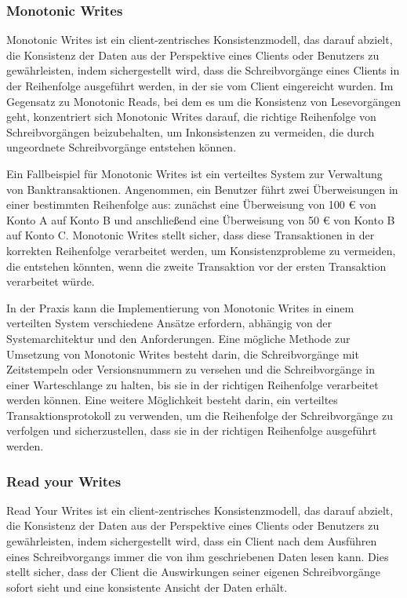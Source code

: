 \documentclass[../vs-script-first-v01.tex]{subfiles}
\begin{document}
\subsubsection{Monotonic Writes}

Monotonic Writes ist ein client-zentrisches Konsistenzmodell, das darauf abzielt, die Konsistenz der Daten aus der Perspektive eines Clients oder Benutzers zu gewährleisten, indem sichergestellt wird, dass die Schreibvorgänge eines Clients in der Reihenfolge ausgeführt werden, in der sie vom Client eingereicht wurden. Im Gegensatz zu Monotonic Reads, bei dem es um die Konsistenz von Lesevorgängen geht, konzentriert sich Monotonic Writes darauf, die richtige Reihenfolge von Schreibvorgängen beizubehalten, um Inkonsistenzen zu vermeiden, die durch ungeordnete Schreibvorgänge entstehen können.

Ein Fallbeispiel für Monotonic Writes ist ein verteiltes System zur Verwaltung von Banktransaktionen. Angenommen, ein Benutzer führt zwei Überweisungen in einer bestimmten Reihenfolge aus: zunächst eine Überweisung von 100 € von Konto A auf Konto B und anschließend eine Überweisung von 50 € von Konto B auf Konto C. Monotonic Writes stellt sicher, dass diese Transaktionen in der korrekten Reihenfolge verarbeitet werden, um Konsistenzprobleme zu vermeiden, die entstehen könnten, wenn die zweite Transaktion vor der ersten Transaktion verarbeitet würde.

In der Praxis kann die Implementierung von Monotonic Writes in einem verteilten System verschiedene Ansätze erfordern, abhängig von der Systemarchitektur und den Anforderungen. Eine mögliche Methode zur Umsetzung von Monotonic Writes besteht darin, die Schreibvorgänge mit Zeitstempeln oder Versionsnummern zu versehen und die Schreibvorgänge in einer Warteschlange zu halten, bis sie in der richtigen Reihenfolge verarbeitet werden können. Eine weitere Möglichkeit besteht darin, ein verteiltes Transaktionsprotokoll zu verwenden, um die Reihenfolge der Schreibvorgänge zu verfolgen und sicherzustellen, dass sie in der richtigen Reihenfolge ausgeführt werden.

\subsubsection{Read your Writes}
Read Your Writes ist ein client-zentrisches Konsistenzmodell, das darauf abzielt, die Konsistenz der Daten aus der Perspektive eines Clients oder Benutzers zu gewährleisten, indem sichergestellt wird, dass ein Client nach dem Ausführen eines Schreibvorgangs immer die von ihm geschriebenen Daten lesen kann. Dies stellt sicher, dass der Client die Auswirkungen seiner eigenen Schreibvorgänge sofort sieht und eine konsistente Ansicht der Daten erhält.
\end{document}
